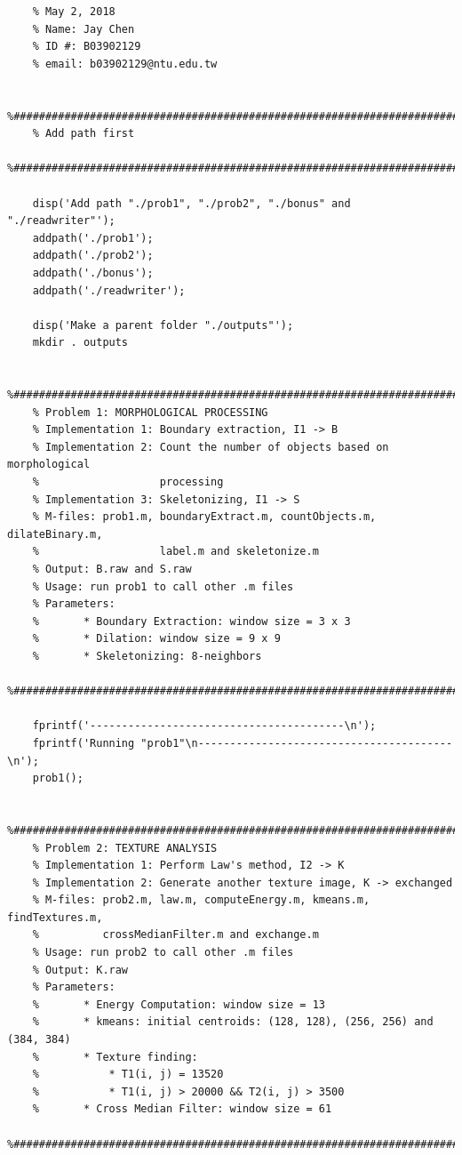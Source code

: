 \documentclass{article}
\begin{document}
\begin{lstlisting}[caption = {README.m}]
    % DIP Homework Assignment #3 
    % May 2, 2018
    % Name: Jay Chen
    % ID #: B03902129 
    % email: b03902129@ntu.edu.tw
    
    %#########################################################################
    % Add path first
    %#########################################################################
    
    disp('Add path "./prob1", "./prob2", "./bonus" and "./readwriter"');
    addpath('./prob1');
    addpath('./prob2');
    addpath('./bonus');
    addpath('./readwriter');
    
    disp('Make a parent folder "./outputs"');
    mkdir . outputs
    
    %######################################################################### 
    % Problem 1: MORPHOLOGICAL PROCESSING                                           
    % Implementation 1: Boundary extraction, I1 -> B     
    % Implementation 2: Count the number of objects based on morphological
    %                   processing
    % Implementation 3: Skeletonizing, I1 -> S
    % M-files: prob1.m, boundaryExtract.m, countObjects.m, dilateBinary.m, 
    %                   label.m and skeletonize.m
    % Output: B.raw and S.raw
    % Usage: run prob1 to call other .m files
    % Parameters:
    %       * Boundary Extraction: window size = 3 x 3
    %       * Dilation: window size = 9 x 9
    %       * Skeletonizing: 8-neighbors
    %#########################################################################
    
    fprintf('----------------------------------------\n');
    fprintf('Running "prob1"\n----------------------------------------\n');
    prob1();
    
    %######################################################################### 
    % Problem 2: TEXTURE ANALYSIS                                           
    % Implementation 1: Perform Law's method, I2 -> K         
    % Implementation 2: Generate another texture image, K -> exchanged
    % M-files: prob2.m, law.m, computeEnergy.m, kmeans.m, findTextures.m, 
    %          crossMedianFilter.m and exchange.m
    % Usage: run prob2 to call other .m files
    % Output: K.raw
    % Parameters:
    %       * Energy Computation: window size = 13
    %       * kmeans: initial centroids: (128, 128), (256, 256) and (384, 384)
    %       * Texture finding: 
    %           * T1(i, j) = 13520
    %           * T1(i, j) > 20000 && T2(i, j) > 3500
    %       * Cross Median Filter: window size = 61
    %#########################################################################
    

\end{lstlisting}
\end{document}
